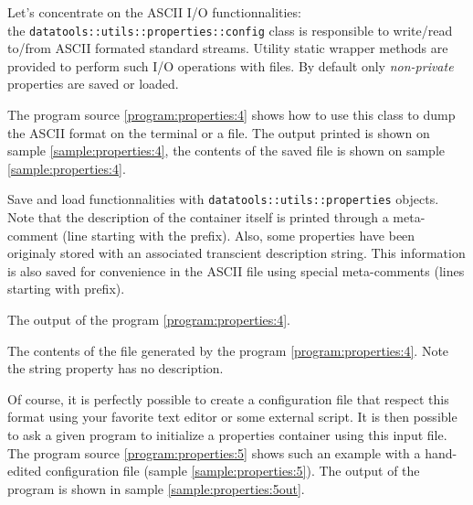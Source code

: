 \pn  Let's  concentrate on  the  ASCII  I/O  functionnalities: \\  the
\texttt{datatools::utils::properties::config} class  is responsible to
write/read  to/from ASCII formated  standard streams.   Utility static
wrapper  methods are  provided  to perform  such  I/O operations  with
files.  By default  only  \emph{non-private} properties  are saved  or
loaded.

The program source  \ref{program:properties:4} shows how to use
this class to dump the ASCII format on the terminal or
a file. The  output   printed  is  shown   on  sample
\ref{sample:properties:4}, the contents of the saved file
is shown on sample \ref{sample:properties:4}.


\begin{program}[h]
\caption{Save        and       load        functionnalities       with
  \texttt{datatools::utils::properties}   objects.    Note  that   the
  description   of  the   container  itself   is  printed   through  a
  meta-comment (line starting  with the  prefix).  Also,
  some  properties  have  been  originaly stored  with  an  associated
  transcient description  string. This  information is also  saved for
  convenience  in the  ASCII file  using special  meta-comments (lines
  starting with  prefix).}
\label{program:properties:4}
\end{program}


\begin{sample}[h]
\caption{The output of the program \ref{program:properties:4}.}
\label{sample:properties:4}
\end{sample}

\begin{sample}[h]
\caption{The   contents  of   the  file   generated  by   the  program
  \ref{program:properties:4}.  Note the  string property  has
  no description.}
\label{sample:properties:4}
\end{sample}

Of course,  it is  perfectly possible to  create a  configuration file
that  respect this  format using  your  favorite text  editor or  some
external  script.  It  is  then possible  to  ask a  given program  to
initialize a properties container  using this input file.  The program
source  \ref{program:properties:5}  shows   such  an  example  with  a
hand-edited  configuration  file  (sample  \ref{sample:properties:5}).
The    output     of    the    program    is     shown    in    sample
\ref{sample:properties:5out}.


